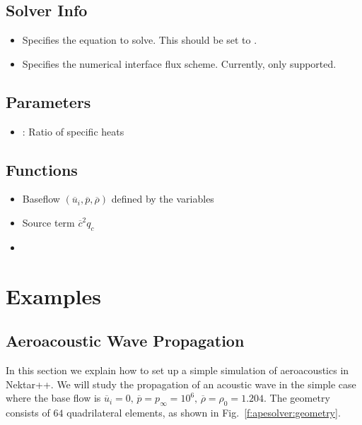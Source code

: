 \subsection{Solver Info}
\begin{itemize}
\item {} Specifies the equation to solve. This should be set to
.
\item {} Specifies the numerical interface flux scheme.
Currently, only  supported.
\end{itemize}

\subsection{Parameters}
\begin{itemize}
\item {}: Ratio of specific heats
\end{itemize}

\subsection{Functions}
\begin{itemize}
\item {} Baseflow $(\overline{u}_i, \overline{p}, \overline{\rho})$ defined by the variables 
\item {} Source term $\overline{c}^2 q_c$
\item {}
\end{itemize}


\section{Examples}
\subsection{Aeroacoustic Wave Propagation}
In this section we explain how to set up a simple simulation of aeroacoustics in
Nektar++. We will study the propagation of an acoustic wave in the simple case
where the base flow is $\overline{u}_i = 0, \, \overline{p}=p_{\infty}=10^6, \, \overline{\rho} = \rho_0 = 1.204$. The geometry consists
of $64$ quadrilateral elements, as shown in Fig.~\ref{f:apesolver:geometry}.

